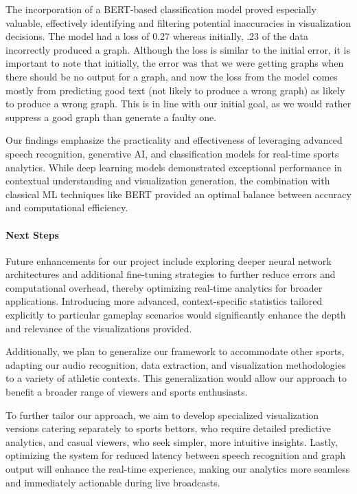 \documentclass{article}
\begin{document}
The incorporation of a BERT-based classification model proved especially valuable, effectively identifying and filtering potential inaccuracies in visualization decisions. The model had a loss of 0.27 whereas initially, .23 of the data incorrectly produced a graph. Although the loss is similar to the initial error, it is important to note that initially, the error was that we were getting graphs when there should be no output for a graph, and now the loss from the model comes mostly from predicting good text (not likely to produce a wrong graph) as likely to produce a wrong graph. This is in line with our initial goal, as we would rather suppress a good graph than generate a faulty one.

Our findings emphasize the practicality and effectiveness of leveraging advanced speech recognition, generative AI, and classification models for real-time sports analytics. While deep learning models demonstrated exceptional performance in contextual understanding and visualization generation, the combination with classical ML techniques like BERT provided an optimal balance between accuracy and computational efficiency.

\paragraph{Next Steps}
Future enhancements for our project include exploring deeper neural network architectures and additional fine-tuning strategies to further reduce errors and computational overhead, thereby optimizing real-time analytics for broader applications. Introducing more advanced, context-specific statistics tailored explicitly to particular gameplay scenarios would significantly enhance the depth and relevance of the visualizations provided.

Additionally, we plan to generalize our framework to accommodate other sports, adapting our audio recognition, data extraction, and visualization methodologies to a variety of athletic contexts. This generalization would allow our approach to benefit a broader range of viewers and sports enthusiasts.

To further tailor our approach, we aim to develop specialized visualization versions catering separately to sports bettors, who require detailed predictive analytics, and casual viewers, who seek simpler, more intuitive insights. Lastly, optimizing the system for reduced latency between speech recognition and graph output will enhance the real-time experience, making our analytics more seamless and immediately actionable during live broadcasts.
\end{document}
